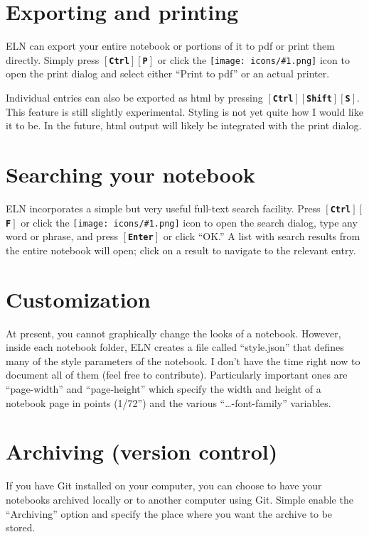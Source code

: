 \documentclass[11pt]{report}
\def\keystroke#1{$\left[\right.\!${\tt\bfseries #1}$\!\left.\right]$}
\def\key#1{\keystroke{#1}}
\def\keycombo#1#2{\keystroke{#1}\keystroke{#2}}
\def\keycontrol#1{\keycombo{Ctrl}{#1}}
\def\controlshift#1{\keystroke{Ctrl}\keystroke{Shift}\keystroke{#1}}
\def\icon#1{\raise-2pt\hbox{\texttt{[image: icons/\#1.png]}}}
\begin{document}
\section{Exporting and printing}

ELN can export your entire notebook or portions of it to pdf or print
them directly. Simply press \keycontrol{P} or click the
\icon{nav-print} icon
to open the print dialog and select either ``Print to pdf'' or an
actual printer.

Individual entries can also be exported as html by pressing
\controlshift{S}. This feature is still slightly experimental. Styling
is not yet quite how I would like it to be. In the future, html output
will likely be integrated with the print dialog. 

\section{Searching your notebook}

ELN incorporates a simple but very useful full-text search
facility. Press \keycontrol{F} or click the \icon{nav-find} icon to open the
search dialog, type any word or phrase, and press \key{Enter} or click
``OK.'' A list with search results from the entire notebook will open;
click on a result to navigate to the relevant entry.

\section{Customization}

At present, you cannot graphically change the looks of a
notebook. However, inside each notebook folder, ELN creates a file
called ``style.json'' that defines many of the style parameters of the
notebook. I don't have the time right now to document all of them
(feel free to contribute). Particularly important ones are
``page-width'' and ``page-height'' which specify the width and height
of a notebook page in points (1/72'') and the various
``\ldots-font-family'' variables.

\section{Archiving (version control)}

If you have Git installed on your computer, you can choose to have
your notebooks archived locally or to another computer using
Git. Simple enable the ``Archiving'' option and specify the place
where you want the archive to be stored.
\end{document}
